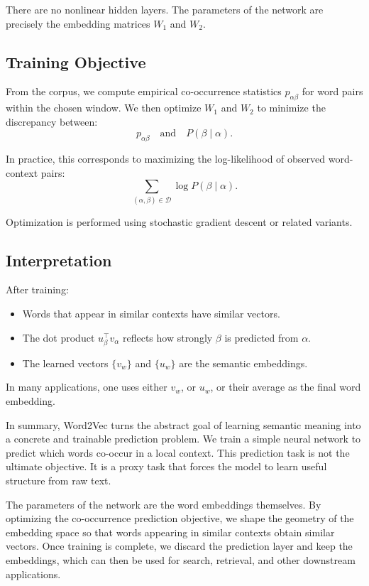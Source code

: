 There are no nonlinear hidden layers. The parameters of the network are precisely the embedding matrices $W_1$ and $W_2$.

\bigskip

\subsection{Training Objective}

\medskip

From the corpus, we compute empirical co-occurrence statistics $p_{\alpha\beta}$ for word pairs within the chosen window. We then optimize $W_1$ and $W_2$ to minimize the discrepancy between:
\[
p_{\alpha\beta}
\quad \text{and} \quad
P(\beta \mid \alpha).
\]

In practice, this corresponds to maximizing the log-likelihood of observed word-context pairs:
\[
\sum_{(\alpha,\beta) \in \mathcal{D}} 
\log P(\beta \mid \alpha).
\]

Optimization is performed using stochastic gradient descent or related variants.

\bigskip

\subsection{Interpretation}

\medskip

After training:

\begin{itemize}
    \item Words that appear in similar contexts have similar vectors.
    \item The dot product $u_\beta^\top v_\alpha$ reflects how strongly $\beta$ is predicted from $\alpha$.
    \item The learned vectors $\{v_w\}$ and $\{u_w\}$ are the semantic embeddings.
\end{itemize}

In many applications, one uses either $v_w$, or $u_w$, or their average as the final word embedding.

\medskip

In summary, Word2Vec turns the abstract goal of learning semantic meaning into a concrete and trainable prediction problem. We train a simple neural network to predict which words co-occur in a local context. This prediction task is not the ultimate objective. It is a proxy task that forces the model to learn useful structure from raw text.

The parameters of the network are the word embeddings themselves. By optimizing the co-occurrence prediction objective, we shape the geometry of the embedding space so that words appearing in similar contexts obtain similar vectors. Once training is complete, we discard the prediction layer and keep the embeddings, which can then be used for search, retrieval, and other downstream applications.

\bigskip

